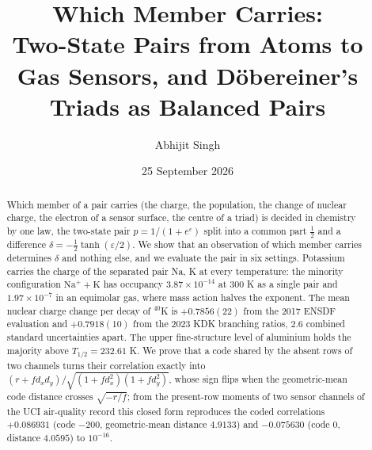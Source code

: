 \documentclass[11pt]{article}
\title{\textbf{Which Member Carries:}\\[4pt]
\large Two-State Pairs from Atoms to Gas Sensors, and D\"obereiner's Triads as Balanced Pairs}
\author{Abhijit Singh}
\date{25 September 2026}
\theoremstyle{definition}\newtheorem{definition}[theorem]{Definition}
\theoremstyle{remark}\newtheorem{remark}[theorem]{Remark}
\begin{document}
\maketitle
\begin{abstract}
Which member of a pair carries (the charge, the population, the change of nuclear charge, the electron of a sensor surface, the centre of a triad) is decided in chemistry by one law, the two-state pair $p=1/(1+e^{\varepsilon})$ split into a common part $\frac12$ and a difference $\delta=-\frac12\tanh(\varepsilon/2)$. We show that an observation of which member carries determines $\delta$ and nothing else, and we evaluate the pair in six settings. Potassium carries the charge of the separated pair Na, K at every temperature: the minority configuration $\mathrm{Na^+}+\mathrm K$ has occupancy $3.87\times10^{-14}$ at 300 K as a single pair and $1.97\times10^{-7}$ in an equimolar gas, where mass action halves the exponent. The mean nuclear charge change per decay of ${}^{40}$K is $+0.7856(22)$ from the 2017 ENSDF evaluation and $+0.7918(10)$ from the 2023 KDK branching ratios, $2.6$ combined standard uncertainties apart. The upper fine-structure level of aluminium holds the majority above $T_{1/2}=232.61$ K. We prove that a code shared by the absent rows of two channels turns their correlation exactly into $(r+fd_xd_y)/\sqrt{(1+fd_x^2)(1+fd_y^2)}$, whose sign flips when the geometric-mean code distance crosses $\sqrt{-r/f}$; from the present-row moments of two sensor channels of the UCI air-quality record this closed form reproduces the coded correlations $+0.086931$ (code $-200$, geometric-mean distance $4.9133$) and $-0.075630$ (code $0$, distance $4.0595$) to $10^{-16}$.


\end{abstract}
\end{document}
